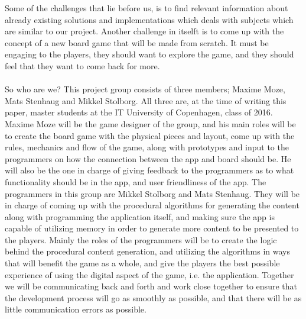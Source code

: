 Some of the challenges that lie before us, is to find relevant information about already existing solutions and implementations which deals with subjects which are similar to our project.
Another challenge in itselft is to come up with the concept of a new board game that will be made from scratch. It must be engaging to the players, they should want to explore the game, and they should feel that they want to come back for more.
\\\\So who are we? This project group consists of three members; Maxime Moze, Mats Stenhaug and Mikkel Stolborg. All three are, at the time of writing this paper, master students at the IT University of Copenhagen, class of 2016. Maxime Moze will be the game designer of the group, and his main roles will be to create the board game with the physical pieces and layout, come up with the rules, mechanics and flow of the game, along with prototypes and input to the programmers on how the connection between the app and board should be. He will also be the one in charge of giving feedback to the programmers as to what functionality should be in the app, and user friendliness of the app.
The programmers in this group are Mikkel Stolborg and Mats Stenhaug. They will be in charge of coming up with the procedural algorithms for generating the content along with programming the application itself, and making sure the app is capable of utilizing memory in order to generate more content to be presented to the players. Mainly the roles of the programmers will be to create the logic behind the procedural content generation, and utilizing the algorithms in ways that will benefit the game as a whole, and give the players the best possible experience of using the digital aspect of the game, i.e. the application.
Together we will be communicating back and forth and work close together to ensure that the development process will go as smoothly as possible, and that there will be as little communication errors as possible.


